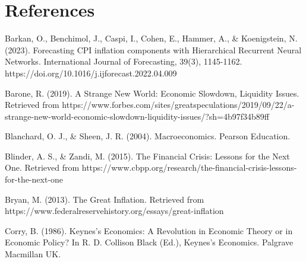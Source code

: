 \documentclass[
  man,floatsintext,
  man]{apa6}
\begin{document}
\newpage

\section{References}\label{references}

\begin{hangparas}{4em}{1}
\noindent Barkan, O., Benchimol, J., Caspi, I., Cohen, E., Hammer, A., \& Koenigstein, N. (2023). Forecasting CPI inflation components with Hierarchical Recurrent Neural Networks. International Journal of Forecasting, 39(3), 1145-1162. https://doi.org/10.1016/j.ijforecast.2022.04.009 \newline
\end{hangparas}

\begin{hangparas}{4em}{1}
\noindent Barone, R. (2019). A Strange New World: Economic Slowdown, Liquidity Issues. Retrieved from https://www.forbes.com/sites/greatspeculations/2019/09/22/a-strange-new-world-economic-slowdown-liquidity-issues/?sh=4b97f34b89ff \newline
\end{hangparas}

\begin{hangparas}{4em}{1}
\noindent Blanchard, O. J., \& Sheen, J. R. (2004). Macroeconomics. Pearson Education.\newline
\end{hangparas}

\begin{hangparas}{4em}{1}
\noindent Blinder, A. S., \& Zandi, M. (2015). The Financial Crisis: Lessons for the Next One. Retrieved from https://www.cbpp.org/research/the-financial-crisis-lessons-for-the-next-one \newline
\end{hangparas}

\begin{hangparas}{4em}{1}
\noindent Bryan, M. (2013). The Great Inflation. Retrieved from https://www.federalreservehistory.org/essays/great-inflation \newline
\end{hangparas}

\begin{hangparas}{4em}{1}
\noindent Corry, B. (1986). Keynes's Economics: A Revolution in Economic Theory or in Economic Policy? In R. D. Collison Black (Ed.), Keynes's Economics. Palgrave Macmillan UK.\newline
\end{hangparas}
\end{document}
